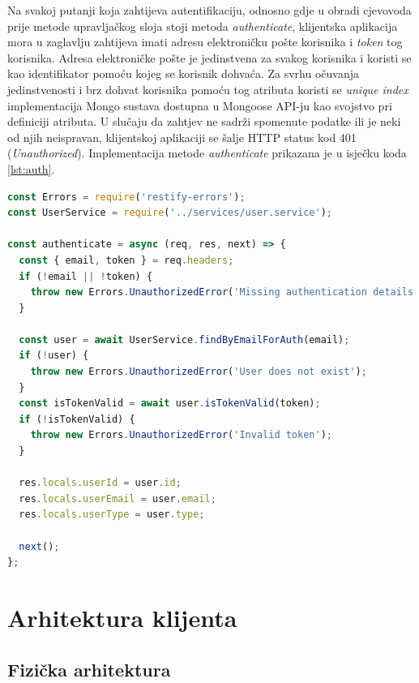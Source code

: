 \documentclass[times, utf8, diplomski, numeric]{fer}
\newcommand{\razmakp}{\vspace{18pt}}
\newcommand{\razmaks}{\vspace{10pt}}
\begin{document}
Na svakoj putanji koja zahtijeva autentifikaciju, odnosno gdje u obradi cjevovoda prije metode upravljačkog sloja stoji metoda \emph{authenticate}, klijentska aplikacija mora u zaglavlju zahtijeva imati adresu elektroničku pošte korisnika i \emph{token} tog korisnika.
Adresa elektroničke pošte je jedinstvena za svakog korisnika i koristi se kao identifikator pomoću kojeg se korisnik dohvaća.
Za svrhu očuvanja jedinstvenosti i brz dohvat korisnika pomoću tog atributa koristi se \emph{unique index} implementacija Mongo sustava\citep{mongo} dostupna u Mongoose API-ju kao svojstvo pri definiciji atributa\citep{mongoose}.
U slučaju da zahtjev ne sadrži spomenute podatke ili je neki od njih neispravan, klijentskoj aplikaciji se šalje HTTP status kod 401 (\emph{Unauthorized}).
Implementacija metode \emph{authenticate} prikazana je u isječku koda \ref{lst:auth}.

\razmakp %
\begin{lstlisting}[language=JavaScript, caption={Implementacija \emph{authenticate} metode u \emph{authentication.middleware.js}}, label={lst:auth}]
const Errors = require('restify-errors');
const UserService = require('../services/user.service');

const authenticate = async (req, res, next) => {
  const { email, token } = req.headers;
  if (!email || !token) {
    throw new Errors.UnauthorizedError('Missing authentication details');
  }

  const user = await UserService.findByEmailForAuth(email);
  if (!user) {
    throw new Errors.UnauthorizedError('User does not exist');
  }
  const isTokenValid = await user.isTokenValid(token);
  if (!isTokenValid) {
    throw new Errors.UnauthorizedError('Invalid token');
  }

  res.locals.userId = user.id;
  res.locals.userEmail = user.email;
  res.locals.userType = user.type;

  next();
};
\end{lstlisting}
\razmaks


\newpage
\section{Arhitektura klijenta}

\razmaks
\subsection{Fizička arhitektura}
\end{document}

